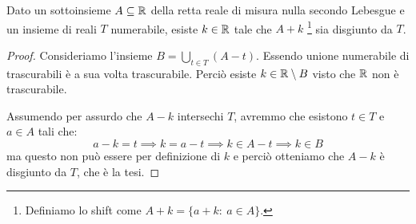 \begin{exercise}
	Dato un sottoinsieme $A\subseteq\mathbb R$ della retta reale di misura nulla secondo Lebesgue e un insieme di reali $T$ numerabile, esiste $k\in \mathbb R$ tale che $A+k$ \footnote{Definiamo lo shift come $A+k=\{a+k:\ a\in A\}$.} sia disgiunto da $T$.
\end{exercise}
\begin{proof}
	Consideriamo l'insieme $B=\bigcup_{t\in T} (A-t)$. 
	Essendo unione numerabile di trascurabili è a sua volta trascurabile.
	Perciò esiste $k\in\mathbb R\setminus B$ visto che $\mathbb R$ non è trascurabile.
	
	Assumendo per assurdo che $A-k$ intersechi $T$, avremmo che esistono $t\in T$ e $a\in A$ tali che:
	\begin{equation*}
		a-k=t\implies k=a-t \implies k\in A-t\implies k\in B	
	\end{equation*}
	ma questo non può essere per definizione di $k$ e perciò otteniamo che $A-k$ è disgiunto da $T$, che è la tesi.
\end{proof}




